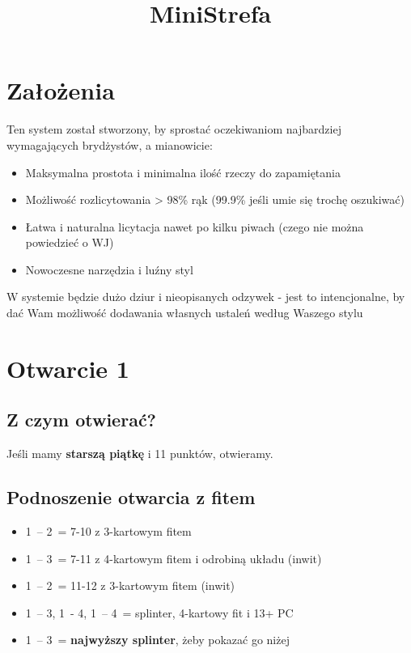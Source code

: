 \documentclass[12pt, a4paper]{article}
\title{\vspace{-2cm}MiniStrefa}
\author{}
\date{}
\begin{document}
\section{Założenia}

Ten system został stworzony, by sprostać oczekiwaniom najbardziej wymagających brydżystów, a mianowicie:
\begin{itemize}
    \item Maksymalna prostota i minimalna ilość rzeczy do zapamiętania
    \item Możliwość rozlicytowania > 98\% rąk (99.9\% jeśli umie się trochę oszukiwać)
    \item Łatwa i naturalna licytacja nawet po kilku piwach (czego nie można powiedzieć o WJ)
    \item Nowoczesne narzędzia i luźny styl
\end{itemize}

W systemie będzie dużo dziur i nieopisanych odzywek - jest to intencjonalne, by dać Wam
możliwość dodawania własnych ustaleń według Waszego stylu

\pagebreak
\section{Otwarcie 1\major}
\subsection*{Z czym otwierać?}
\begin{formal}
    Jeśli mamy \textbf{starszą piątkę} i 11 punktów, otwieramy.
\end{formal}

\subsection*{Podnoszenie otwarcia z fitem}
\begin{itemize}
    \item 1\major\ -- 2\major\ = 7-10 z 3-kartowym fitem
    \item 1\major\ -- 3\major\ = 7-11 z 4-kartowym fitem i odrobiną układu (inwit)
    \item 1\major\ -- 2\nt\ = 11-12 z 3-kartowym fitem (inwit)
    \item 1\hearts\ -- 3\spades, 1\major\ - 4\clubs, 1\spades\ -- 4\diams\ = splinter, 4-kartowy fit i 13+ PC
    \item 1\major\ -- 3\nt\ = \textbf{najwyższy splinter}, żeby pokazać go niżej
\end{itemize}
\end{document}
